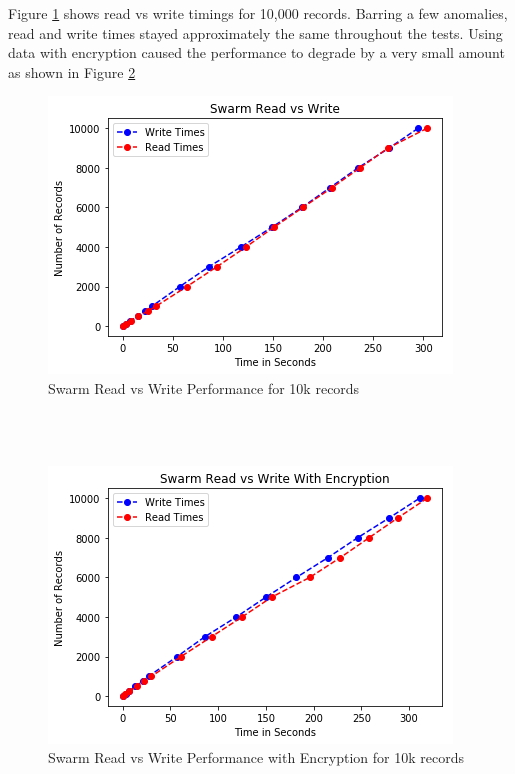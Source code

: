 \documentclass[11pt,openright]{report}
\begin{document}
Figure \ref{fig:graph_swarm_readvwrite} shows read vs write timings for 10,000 records. Barring a few anomalies, read and write times stayed approximately the same throughout the tests. Using data with encryption caused the performance to degrade by a very small amount as shown in Figure \ref{fig:graph_swarm_readvwrite_encr}
\newline
\newline
\begin{figure}[!htbp]
    \centering
    \includegraphics[scale=1]{results/graphs/Swarm_Read_v_Write.png}
    \caption{Swarm Read vs Write Performance for 10k records}
    \label{fig:graph_swarm_readvwrite}
\end{figure}
\hfill\\
\hfill\\
\begin{figure}[!htbp]
    \centering
    \includegraphics[scale=1]{results/graphs/Swarm_Read_v_Write_Encr.png}
    \caption{Swarm Read vs Write Performance with Encryption for 10k records}
    \label{fig:graph_swarm_readvwrite_encr}
\end{figure}
\end{document}
